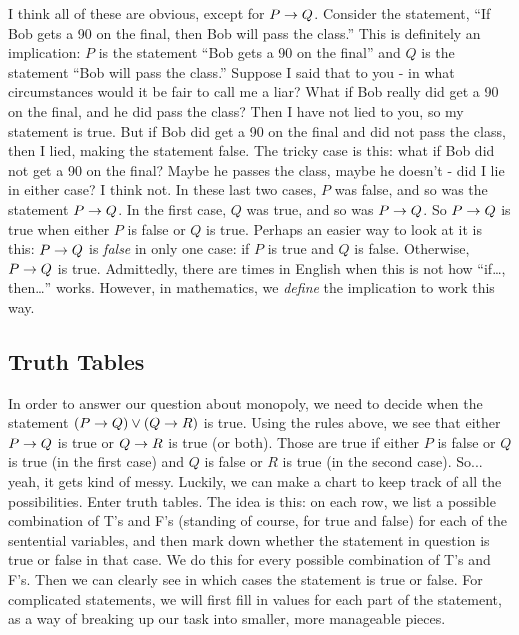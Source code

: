\documentclass[12pt]{article}
\begin{document}
I think all of these are obvious, except for $P \rightarrow Q$.  Consider the statement, ``If Bob gets a 90 on the final, then Bob will pass the class.''  This is definitely an implication: $P$ is the statement ``Bob gets a 90 on the final'' and $Q$ is the statement ``Bob will pass the class.'' Suppose I said that to you - in what circumstances would it be fair to call me a liar?  What if Bob really did get a 90 on the final, and he did pass the class?  Then I have not lied to you, so my statement is true.  But if Bob did get a 90 on the final and did not pass the class, then I lied, making the statement false.  The tricky case is this: what if Bob did not get a 90 on the final?  Maybe he passes the class, maybe he doesn't - did I lie in either case?  I think not.  In these last two cases, $P$ was false, and so was the statement $P \rightarrow Q$.  In the first case, $Q$ was true, and so was $P \rightarrow Q$.  So $P \rightarrow Q$ is true when either $P$ is false or $Q$ is true.  Perhaps an easier way to look at it is this: $P \rightarrow Q$ 
is {\em false} in only one case: if $P$ is true and $Q$ is false.  Otherwise, $P \rightarrow Q$ is true.  Admittedly, there are times in English when this is not how ``if\ldots, then\ldots'' works.  However, in mathematics, we {\em define} the implication to work this way.


\subsection{Truth Tables}

In order to answer our question about monopoly, we need to decide when the statement $(P \rightarrow Q) \vee (Q \rightarrow R)$ is true.  Using the rules above, we see that either $P \rightarrow Q$ is true or $Q \rightarrow R$ is true (or both).  Those are true if either $P$ is false or $Q$ is true (in the first case) and $Q$ is false or $R$ is true (in the second case).  So... yeah, it gets kind of messy.  Luckily, we can make a chart to keep track of all the possibilities.  Enter truth tables.  The idea is this: on each row, we list a possible combination of T's and F's (standing of course, for true and false) for each of the sentential variables, and then mark down whether the statement in question is true or false in that case.  We do this for every possible combination of T's and F's.  Then we can clearly see in which cases the statement is true or false.  For complicated statements, we will first fill in values for each part of the statement, as a way of breaking up our task into smaller, more manageable pieces.
\end{document}
